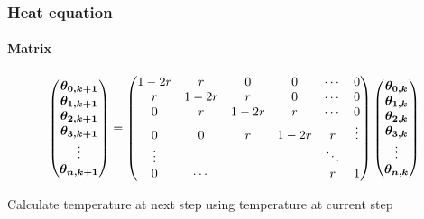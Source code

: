 \documentclass[aspectratio=169]{beamer}
\newcommand{\bvec}[1]{\mbox{\boldmath $#1$}}
\begin{document}
\begin{frame}
    \frametitle{Heat equation}
    \framesubtitle{Matrix}
    \begin{equation}
        \begin{pmatrix}
            \bvec{\theta_{0, k+1}} \\
            \bvec{\theta_{1, k+1}} \\
            \bvec{\theta_{2, k+1}} \\
            \bvec{\theta_{3, k+1}} \\
            \vdots \\
            \bvec{\theta_{n, k+1}} \\
        \end{pmatrix}
         = 
        \begin{pmatrix}
            1 - 2r & r & 0 & 0 & \cdots & 0 \\
            r & 1 - 2r & r & 0 & \cdots & 0 \\
            0 & r & 1 - 2r & r & \cdots & 0 \\
            0 & 0 & r & 1 - 2r & r & \vdots \\
            \vdots & & & & \ddots \\
            0 & \cdots & & & r & 1 
        \end{pmatrix}
        \begin{pmatrix}
            \bvec{\theta_{0, k}} \\
            \bvec{\theta_{1, k}} \\
            \bvec{\theta_{2, k}} \\
            \bvec{\theta_{3, k}} \\
            \vdots \\
            \bvec{\theta_{n, k}} \\
            
        \end{pmatrix}
    \end{equation}

    \vspace{5mm}
    \centering
    Calculate temperature at next step using temperature at current step
\end{frame}
\end{document}

